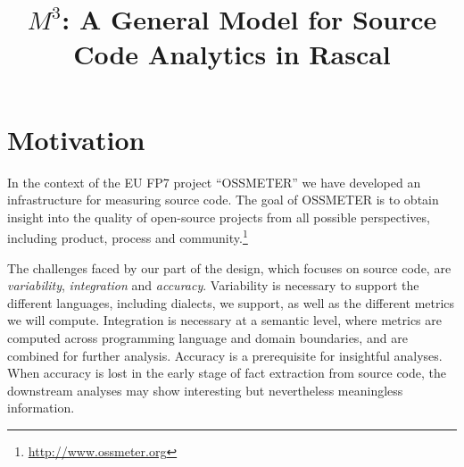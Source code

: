 \documentclass[conference]{IEEEtran}
\begin{document}
\title{{\huge $M^3$: A General Model for Source Code Analytics in Rascal}}

\author{
\and
{}
}

\maketitle

\section{Motivation}

In the context of the EU FP7 project ``OSSMETER'' we have developed an
infrastructure for measuring source code. The goal of OSSMETER is to obtain
insight into the quality of open-source projects from all possible perspectives,
including product, process and
community.\!\footnote{\url{http://www.ossmeter.org}}

The challenges faced by our part of the design, which focuses on source code,
are \emph{variability}, \emph{integration} and \emph{accuracy}. Variability is
necessary to support the different languages, including dialects, we support,
as well as the different metrics we will compute. Integration is necessary at
a semantic level, where metrics are computed across programming language and
domain boundaries, and are combined for further analysis. Accuracy is a
prerequisite for insightful analyses. When accuracy is lost in the early stage
of fact extraction from source code, the downstream analyses may show
interesting but nevertheless meaningless information.
\end{document}
